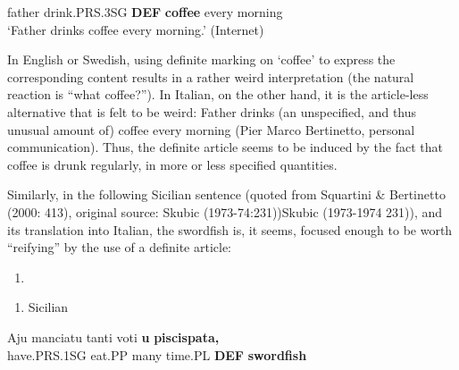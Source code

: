 father  drink.PRS.3SG  \textbf{DEF} \textbf{coffee} every  morning\\ %


‘Father drinks coffee every morning.’ (Internet)
\z


In English or Swedish, using definite marking on ‘coffee’ to express the corresponding content results in a rather weird interpretation (the natural reaction is “what coffee?”). In Italian, on the other hand, it is the article-less alternative that is felt to be weird: Father drinks (an unspecified, and thus unusual amount of) coffee every morning (Pier Marco Bertinetto, personal communication). Thus, the definite article seems to be induced by the fact that coffee is drunk regularly, in more or less specified quantities. 

Similarly, in the following Sicilian sentence (quoted from Squartini \& Bertinetto (2000: 413), original source: Skubic (1973-74:231))Skubic (1973-1974 231)), and its translation into Italian, the swordfish is, it seems, focused enough to be worth “reifying” by the use of a definite article:

\begin{enumerate} %
\item 
\end{enumerate} %
\setcounter{listLFOxcviiileveli}{0}
\begin{enumerate} %
\item 
Sicilian

\end{enumerate} %
\ea\label{}
\gll Aju  manciatu  tanti  voti  \textbf{u} \textbf{piscispata,}\\


have.PRS.1SG  eat.PP  many  time.PL  \textbf{DEF} \textbf{swordfish}\\ %



